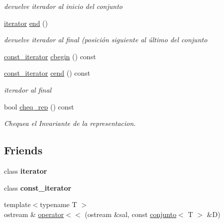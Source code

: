 \begin{DoxyCompactItemize}
\begin{DoxyCompactList}\small\item\em devuelve iterador al inicio del conjunto \end{DoxyCompactList}\item 
\hypertarget{classconjunto_ab9be89e672032da4f0945663c76e9f1b}{}\hyperlink{classconjunto_1_1iterator}{iterator} \hyperlink{classconjunto_ab9be89e672032da4f0945663c76e9f1b}{end} ()\label{classconjunto_ab9be89e672032da4f0945663c76e9f1b}

\begin{DoxyCompactList}\small\item\em devuelve iterador al final (posición siguiente al último del conjunto \end{DoxyCompactList}\item 
\hyperlink{classconjunto_1_1const__iterator}{const\+\_\+iterator} \hyperlink{classconjunto_a78ee14dbb357a4383f021d9b29a250ed}{cbegin} () const 
\item 
\hyperlink{classconjunto_1_1const__iterator}{const\+\_\+iterator} \hyperlink{classconjunto_a7e07e4ac274c404bdaeb6159cb480d6a}{cend} () const 
\begin{DoxyCompactList}\small\item\em iterador al final \end{DoxyCompactList}\item 
bool \hyperlink{classconjunto_a29289cb22c2a18055e93ae543f6a6845}{cheq\+\_\+rep} () const 
\begin{DoxyCompactList}\small\item\em Chequea el Invariante de la representacion. \end{DoxyCompactList}\end{DoxyCompactItemize}
\subsection*{Friends}
\begin{DoxyCompactItemize}
\item 
\hypertarget{classconjunto_a67171474c4da6cc8efe0c7fafefd2b2d}{}class {\bfseries iterator}\label{classconjunto_a67171474c4da6cc8efe0c7fafefd2b2d}

\item 
\hypertarget{classconjunto_ac220ce1c155db1ac44146c12d178056f}{}class {\bfseries const\+\_\+iterator}\label{classconjunto_ac220ce1c155db1ac44146c12d178056f}

\item 
{\footnotesize template$<$typename T $>$ }\\ostream \& \hyperlink{classconjunto_a30a964c0903c1ffce82c436e84d83880}{operator$<$$<$} (ostream \&sal, const \hyperlink{classconjunto}{conjunto}$<$ T $>$ \&D)
\end{DoxyCompactItemize}


